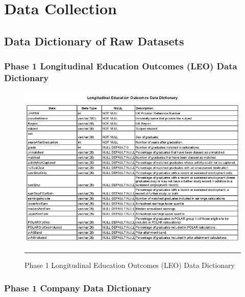 \chapter{Data Collection} 
\label{AppendixI} 


\section {Data Dictionary of Raw Datasets}

\subsection{Phase 1 Longitudinal Education Outcomes (LEO) Data Dictionary}

\begin{figure}[H]
	\centering
	\includegraphics[width=1.0\textwidth]{Data-Dictionary/LEO.png}
	\rule{35em}{0.7pt}
	\caption[Phase 1 Longitudinal Education Outcomes (LEO) Data Dictionary]{Phase 1 Longitudinal Education Outcomes (LEO) Data Dictionary}
\end{figure}

\subsection{Phase 1 Company Data Dictionary}

